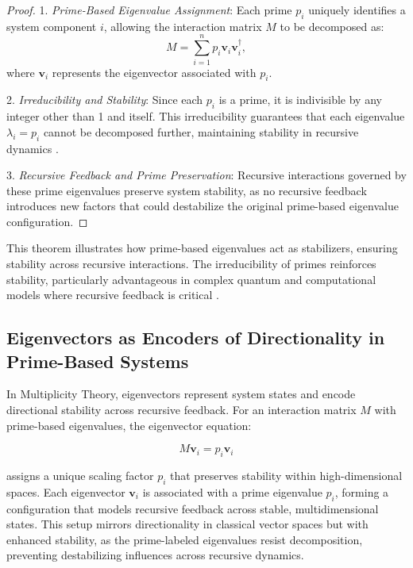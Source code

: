 \documentclass{article}
\begin{document}
\begin{proof}
1. \textit{Prime-Based Eigenvalue Assignment}: Each prime \( p_i \) uniquely identifies a system component \( i \), allowing the interaction matrix \( M \) to be decomposed as:
   \[
   M = \sum_{i=1}^{n} p_i \mathbf{v}_i \mathbf{v}_i^{\dagger},
   \]
   where \( \mathbf{v}_i \) represents the eigenvector associated with \( p_i \).

2. \textit{Irreducibility and Stability}: Since each \( p_i \) is a prime, it is indivisible by any integer other than 1 and itself. This irreducibility guarantees that each eigenvalue \( \lambda_i = p_i \) cannot be decomposed further, maintaining stability in recursive dynamics \citep{nielsen2010, freeman2004}.

3. \textit{Recursive Feedback and Prime Preservation}: Recursive interactions governed by these prime eigenvalues preserve system stability, as no recursive feedback introduces new factors that could destabilize the original prime-based eigenvalue configuration.
\end{proof}

This theorem illustrates how prime-based eigenvalues act as stabilizers, ensuring stability across recursive interactions. The irreducibility of primes reinforces stability, particularly advantageous in complex quantum and computational models where recursive feedback is critical \citep{gottesman1997, shor1997}.

\subsection{Eigenvectors as Encoders of Directionality in Prime-Based Systems}

In Multiplicity Theory, eigenvectors represent system states and encode directional stability across recursive feedback. For an interaction matrix \( M \) with prime-based eigenvalues, the eigenvector equation:

\begin{equation}
M \mathbf{v}_i = p_i \mathbf{v}_i
\end{equation}

assigns a unique scaling factor \( p_i \) that preserves stability within high-dimensional spaces. Each eigenvector \( \mathbf{v}_i \) is associated with a prime eigenvalue \( p_i \), forming a configuration that models recursive feedback across stable, multidimensional states. This setup mirrors directionality in classical vector spaces but with enhanced stability, as the prime-labeled eigenvalues resist decomposition, preventing destabilizing influences across recursive dynamics.
\end{document}

